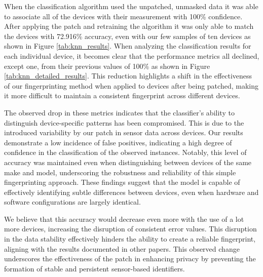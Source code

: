 \documentclass[11pt,
  oneside,openany,    %
]{scrreprt}
\begin{document}
When the classification algorithm used the unpatched, unmasked data it was able to associate all of the devices with their measurement with 100\% confidence.
After applying the patch and retraining the algorithm it was only able to match the devices with 72.916\% accuracy, even with our few samples of ten devices as shown in Figure \ref{tab:knn_results}. 
When analyzing the classification results for each individual device, it becomes clear that the performance metrics all declined, except one, from their previous values of 100\% as shown in Figure \ref{tab:knn_detailed_results}.
This reduction highlights a shift in the effectiveness of our fingerprinting method when applied to devices after being patched, making it more difficult to maintain a consistent fingerprint across different devices.

The observed drop in these metrics indicates that the classifier's ability to distinguish device-specific patterns has been compromised.
This is due to the introduced variability by our patch in sensor data across devices.
Our results demonstrate a low incidence of false positives, indicating a high degree of confidence in the classification of the observed instances.
Notably, this level of accuracy was maintained even when distinguishing between devices of the same make and model, underscoring the robustness and reliability of this simple fingerprinting approach.
These findings suggest that the model is capable of effectively identifying subtle differences between devices, even when hardware and software configurations are largely identical.

We believe that this accuracy would decrease even more with the use of a lot more devices, increasing the disruption of consistent error values.
This disruption in the data stability effectively hinders the ability to create a reliable fingerprint, aligning with the results documented in other papers.
This observed change underscores the effectiveness of the patch in enhancing privacy by preventing the formation of stable and persistent sensor-based identifiers.
\end{document}
